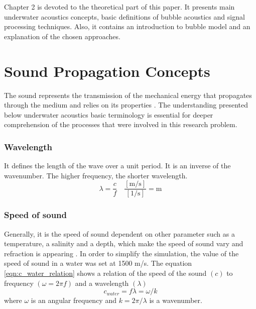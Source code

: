 Chapter 2 is devoted to the theoretical part of this paper. It presents main underwater acoustics concepts, basic definitions of bubble acoustics and signal processing techniques. Also, it contains an introduction to bubble model and an explanation of the chosen approaches.

\section{Sound Propagation Concepts}

The sound represents the transmission of the mechanical energy that  propagates through the medium and relies on its properties \cite[p.1]{leighton_acoustic_2012}. The understanding presented below underwater acoustics basic terminology is essential for deeper comprehension of the processes that were involved in this research problem.
\subsubsection{Wavelength}
It defines the length of the wave over a unit period. It is an inverse of the wavenumber. The higher frequency, the shorter wavelength.
\begin{equation}
    \lambda = \frac{c}{f} \quad \frac{[\text{m/s}]}{[\text{1/s}]} = \text{m}
\end{equation}

\subsubsection{Speed of sound}
Generally, it is the speed of sound dependent on other parameter such as a temperature, a salinity and a depth, which make the speed of sound vary and refraction is appearing \cite[p. 28]{hodges_underwater_2011}. In order to simplify the simulation, the value of the speed of sound in a water was set at 1500 m/s. 
The equation \ref{eqn:c_water_relation} shows a relation of the speed of the sound $(c)$ to frequency $(\omega = 2\pi f)$ and a wavelength $(\lambda)$  
\begin{equation}
    c_{water} = f\lambda = \omega / k
    \label{eqn:c_water_relation}
\end{equation}
where $\omega$ is an angular frequency and $k=2\pi/\lambda$ is a wavenumber.
